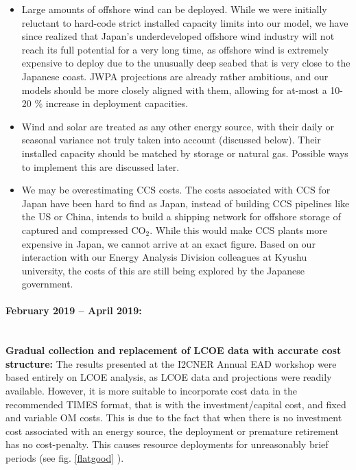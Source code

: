 \documentclass[14pt,a4paper]{article} %
\begin{document}
\begin{itemize}

\item Large amounts of offshore wind can be deployed. While we were initially reluctant to hard-code strict installed  capacity limits into our model, we have since realized that Japan's underdeveloped offshore wind industry will not reach its full potential for a very long time, as offshore wind is extremely expensive to deploy due to the unusually deep seabed that is very close to the Japanese coast. \gls{JWPA} projections \cite{heger_wind_2016} are already rather ambitious, and our models should be more closely aligned with them, allowing for at-most a 10-20 \% increase in deployment capacities.

\item Wind and solar are treated as any other energy source, with their daily or seasonal variance not truly taken into account (discussed below). Their installed capacity should be matched by storage or natural gas. Possible ways to implement this are discussed later.

\item We may be overestimating \gls{CCS} costs. The costs associated with \gls{CCS} for Japan have been hard to find as Japan, instead of building \gls{CCS} pipelines like the US or China, intends to build a shipping network for offshore storage of captured and compressed CO$_2$. While this would make \gls{CCS} plants more expensive in Japan, we cannot arrive at an exact figure. Based on our interaction with our Energy Analysis Division colleagues at Kyushu university, the costs of this are still being explored by the Japanese government.

\end{itemize}

\paragraph{February 2019 – April 2019:} ~ \\


\textbf{Gradual collection and replacement of \gls{LCOE} data with accurate cost structure:} The results presented at the \gls{I2CNER} Annual \gls{EAD} workshop \cite{chaube_dynamic_2019} were based entirely on \gls{LCOE} analysis, as \gls{LCOE} data and projections were readily available. However, it is more suitable to incorporate cost data in the recommended \gls{TIMES} format, that is with the investment/capital cost, and fixed and variable \gls{OM} costs. This is due to the fact that when there is no investment cost associated with an energy source, the deployment or premature retirement has no cost-penalty. This causes resource deployments for unreasonably brief periods (see fig. \ref{flatgood} ).
\end{document}
